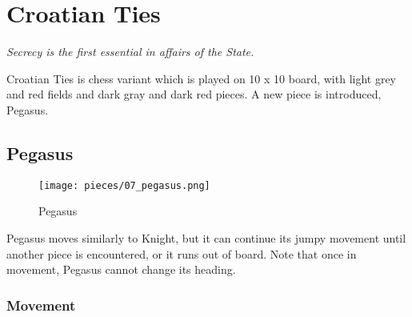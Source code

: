 

\chapter*{Croatian Ties}
\label{ch:Croatian Ties}

\begin{flushright}
\parbox{0.7\textwidth}{
\emph{Secrecy is the first essential in affairs of the State. \newline
{} } }
\end{flushright}

\noindent
Croatian Ties is chess variant which is played on 10 x 10 board,
with light grey and red fields and dark gray and dark red pieces.
A new piece is introduced, Pegasus.

\clearpage %

\section*{Pegasus}
\label{sec:Croatian Ties/Pegasus}

\noindent
\begin{wrapfigure}[6]{l}{0.4\textwidth}
\centering
\texttt{[image: pieces/07\_pegasus.png]}
\caption{Pegasus}
\label{fig:07_pegasus}
\end{wrapfigure}
Pegasus moves similarly to Knight, but it can continue its jumpy movement
until another piece is encountered, or it runs out of board. Note that once
in movement, Pegasus cannot change its heading.

\vspace{5.0\baselineskip}
\subsection*{Movement}
\label{sec:Croatian Ties/Pegasus/Movement}

